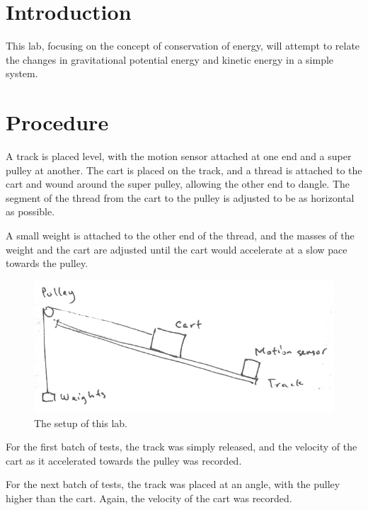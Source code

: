 \section{Introduction}

This lab, focusing on the concept of conservation of energy, will attempt to relate the changes in gravitational potential energy and kinetic energy in a simple system.

\section{Procedure}

A track is placed level, with the motion sensor attached at one end and a super pulley at another.
The cart is placed on the track, and a thread is attached to the cart and wound around the super pulley, allowing the other end to dangle.
The segment of the thread from the cart to the pulley is adjusted to be as horizontal as possible.

A small weight is attached to the other end of the thread, and the masses of the weight and the cart are adjusted until the cart would accelerate at a slow pace towards the pulley.

\begin{figure}[h]

\begin{center}
\includegraphics[scale=0.5]{content/fig1}
\end{center}

\caption{The setup of this lab.}

\end{figure}

For the first batch of tests, the track was simply released, and the velocity of the cart as it accelerated towards the pulley was recorded.

For the next batch of tests, the track was placed at an angle, with the pulley higher than the cart.
Again, the velocity of the cart was recorded.

